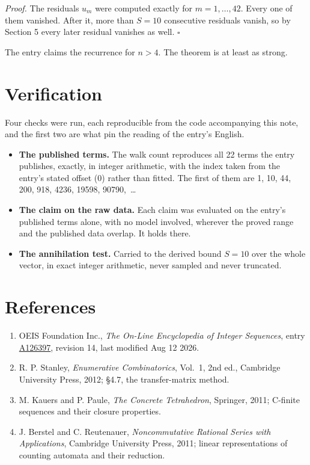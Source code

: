 \documentclass[11pt]{article}
\theoremstyle{definition}
\begin{document}
{\itshape Proof.} The residuals $u_m$ were computed exactly for $m = 1,\dots,42$. Every one of them vanished. After it, more than $S = 10$ consecutive residuals vanish, so by Section 5 every later residual vanishes as well. $\square$

The entry claims the recurrence for $n > 4$. The theorem is at least as strong.

\section{Verification}

Four checks were run, each reproducible from the code accompanying this note, and the first two are what pin the reading of the entry's English.

\begin{itemize}

\item {\bfseries The published terms.} The walk count reproduces all 22 terms the entry publishes, exactly, in integer arithmetic, with the index taken from the entry's stated offset (0) rather than fitted. The first of them are 1, 10, 44, 200, 918, 4236, 19598, 90790,~\dots

\item {\bfseries The claim on the raw data.} Each claim was evaluated on the entry's published terms alone, with no model involved, wherever the proved range and the published data overlap. It holds there.

\item {\bfseries The annihilation test.} Carried to the derived bound $S = 10$ over the whole vector, in exact integer arithmetic, never sampled and never truncated.

\end{itemize}

\section{References}

\begin{enumerate}

\item OEIS Foundation Inc., \emph{The On-Line Encyclopedia of Integer Sequences}, entry \href{https://oeis.org/A126397}{A126397}, revision 14, last modified Aug 12 2026.

\item R. P. Stanley, \emph{Enumerative Combinatorics}, Vol.~1, 2nd ed., Cambridge University Press, 2012; \S4.7, the transfer-matrix method.

\item M. Kauers and P. Paule, \emph{The Concrete Tetrahedron}, Springer, 2011; C-finite sequences and their closure properties.

\item J. Berstel and C. Reutenauer, \emph{Noncommutative Rational Series with Applications}, Cambridge University Press, 2011; linear representations of counting automata and their reduction.

\end{enumerate}
\end{document}
